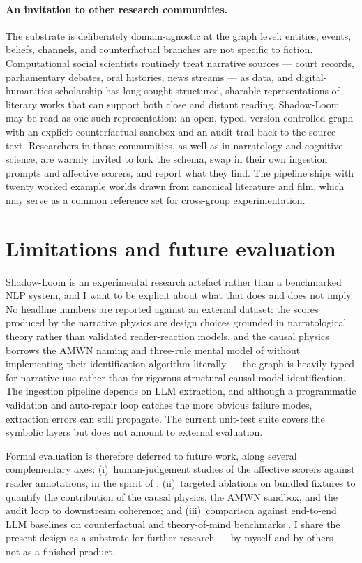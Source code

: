 \documentclass[11pt]{article}
\begin{document}
\paragraph{An invitation to other research communities.}
The substrate is deliberately domain-agnostic at the graph level:
entities, events, beliefs, channels, and counterfactual branches
are not specific to fiction. Computational social scientists
\citep{lazer2009css} routinely treat narrative sources --- court
records, parliamentary debates, oral histories, news streams ---
as data, and digital-humanities scholarship has long sought
structured, sharable representations of literary works that can
support both close and distant reading. Shadow-Loom may be read
as one such representation: an open, typed, version-controlled
graph with an explicit counterfactual sandbox and an audit trail
back to the source text. Researchers in those communities, as
well as in narratology and cognitive science, are warmly invited
to fork the schema, swap in their own ingestion prompts and
affective scorers, and report what they find. The pipeline ships
with twenty worked example worlds drawn from canonical
literature and film, which may serve as a common reference set
for cross-group experimentation.


\section{Limitations and future evaluation}
\label{sec:limits}

Shadow-Loom is an experimental research artefact rather than a
benchmarked NLP system, and I want to be explicit about what that
does and does not imply. No headline numbers are reported against
an external dataset: the scores produced by the narrative physics
are design choices grounded in narratological theory rather than
validated reader-reaction models, and the causal physics borrows
the AMWN naming and three-rule mental model of
\citet{correa2025amwn} without implementing their identification
algorithm literally --- the graph is heavily typed for narrative
use rather than for rigorous structural causal model
identification. The ingestion pipeline depends on LLM extraction,
and although a programmatic validation and auto-repair loop
catches the more obvious failure modes, extraction errors can
still propagate. The current unit-test suite covers the symbolic
layers but does not amount to external evaluation.

Formal evaluation is therefore deferred to future work, along
several complementary axes: (i)~human-judgement studies of the
affective scorers against reader annotations, in the spirit of
\citet{wilmot2020suspense}; (ii)~targeted ablations on bundled
fixtures to quantify the contribution of the causal physics, the
AMWN sandbox, and the audit loop to downstream coherence; and
(iii)~comparison against end-to-end LLM baselines on counterfactual
and theory-of-mind benchmarks \citep{kim2023fantom,gu2026simpletom,
cross2024hyp,xu2025echoes}. I share the present design as a
substrate for further research --- by myself and by others ---
not as a finished product.
\end{document}
